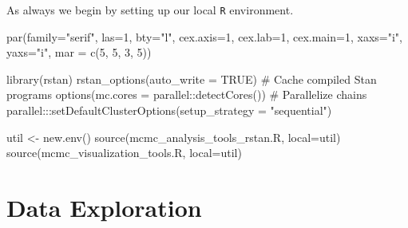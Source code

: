 \documentclass[
  letterpaper,
  DIV=11,
  numbers=noendperiod]{scrartcl}
\newenvironment{Shaded}{\begin{snugshade}}{\end{snugshade}}
\newcommand{\AttributeTok}[1]{\textcolor[rgb]{0.40,0.45,0.13}{#1}}
\newcommand{\CommentTok}[1]{\textcolor[rgb]{0.37,0.37,0.37}{#1}}
\newcommand{\ConstantTok}[1]{\textcolor[rgb]{0.56,0.35,0.01}{#1}}
\newcommand{\DecValTok}[1]{\textcolor[rgb]{0.68,0.00,0.00}{#1}}
\newcommand{\FunctionTok}[1]{\textcolor[rgb]{0.28,0.35,0.67}{#1}}
\newcommand{\NormalTok}[1]{\textcolor[rgb]{0.00,0.23,0.31}{#1}}
\newcommand{\OtherTok}[1]{\textcolor[rgb]{0.00,0.23,0.31}{#1}}
\newcommand{\SpecialCharTok}[1]{\textcolor[rgb]{0.37,0.37,0.37}{#1}}
\newcommand{\StringTok}[1]{\textcolor[rgb]{0.13,0.47,0.30}{#1}}
\begin{document}
As always we begin by setting up our local \texttt{R} environment.

\begin{Shaded}
\begin{Highlighting}[]
\FunctionTok{par}\NormalTok{(}\AttributeTok{family=}\StringTok{"serif"}\NormalTok{, }\AttributeTok{las=}\DecValTok{1}\NormalTok{, }\AttributeTok{bty=}\StringTok{"l"}\NormalTok{,}
    \AttributeTok{cex.axis=}\DecValTok{1}\NormalTok{, }\AttributeTok{cex.lab=}\DecValTok{1}\NormalTok{, }\AttributeTok{cex.main=}\DecValTok{1}\NormalTok{,}
    \AttributeTok{xaxs=}\StringTok{"i"}\NormalTok{, }\AttributeTok{yaxs=}\StringTok{"i"}\NormalTok{, }\AttributeTok{mar =} \FunctionTok{c}\NormalTok{(}\DecValTok{5}\NormalTok{, }\DecValTok{5}\NormalTok{, }\DecValTok{3}\NormalTok{, }\DecValTok{5}\NormalTok{))}
\end{Highlighting}
\end{Shaded}

\begin{Shaded}
\begin{Highlighting}[]
\FunctionTok{library}\NormalTok{(rstan)}
\FunctionTok{rstan\_options}\NormalTok{(}\AttributeTok{auto\_write =} \ConstantTok{TRUE}\NormalTok{)            }\CommentTok{\# Cache compiled Stan programs}
\FunctionTok{options}\NormalTok{(}\AttributeTok{mc.cores =}\NormalTok{ parallel}\SpecialCharTok{::}\FunctionTok{detectCores}\NormalTok{()) }\CommentTok{\# Parallelize chains}
\NormalTok{parallel}\SpecialCharTok{:::}\FunctionTok{setDefaultClusterOptions}\NormalTok{(}\AttributeTok{setup\_strategy =} \StringTok{"sequential"}\NormalTok{)}
\end{Highlighting}
\end{Shaded}

\begin{Shaded}
\begin{Highlighting}[]
\NormalTok{util }\OtherTok{\textless{}{-}} \FunctionTok{new.env}\NormalTok{()}
\FunctionTok{source}\NormalTok{(}\StringTok{\textquotesingle{}mcmc\_analysis\_tools\_rstan.R\textquotesingle{}}\NormalTok{, }\AttributeTok{local=}\NormalTok{util)}
\FunctionTok{source}\NormalTok{(}\StringTok{\textquotesingle{}mcmc\_visualization\_tools.R\textquotesingle{}}\NormalTok{, }\AttributeTok{local=}\NormalTok{util)}
\end{Highlighting}
\end{Shaded}

\section{Data Exploration}\label{data-exploration}
\end{document}
